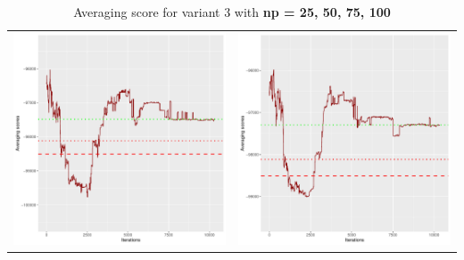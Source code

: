 \documentclass[]{scrartcl}
\begin{document}
\begin{table}[h!]
\begin{tabular}{cc}
\includegraphics[scale = 0.4]{./figs/hepar2/v3/75/avgBoundsEvolution-10352.pdf} & 
\includegraphics[scale = 0.4]{./figs/hepar2/v3/100/avgBoundsEvolution-10352.pdf} \\
\end{tabular}
\caption{Averaging score for variant 3 with \textbf{np =  25, 50, 75, 100}}
\end{table}
\end{document}
